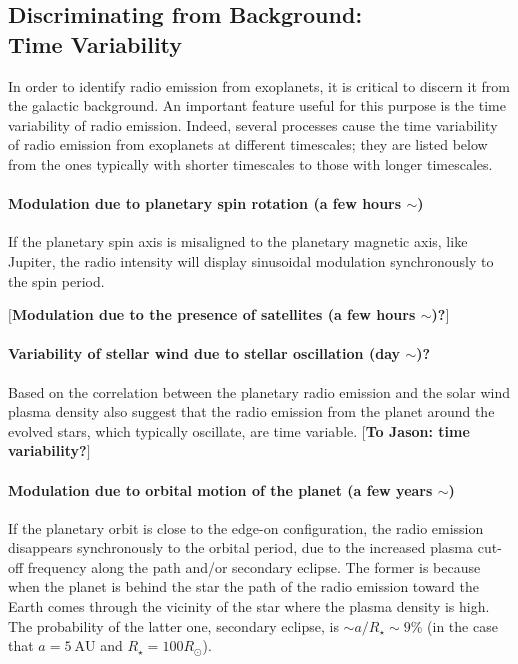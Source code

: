\documentclass{emulateapj}
\def\memoYF#1{\color{red}$[${\bf #1}$]$ \color{black}}
\begin{document}
\subsection{Discriminating from Background:\\Time Variability}
\label{ss:timevariability}


In order to identify radio emission from exoplanets, it is critical to discern it from the galactic background. 
An important feature useful for this purpose is the time variability of radio emission. 
Indeed, several processes cause the time variability of radio emission from exoplanets at different timescales; they are listed below from the ones typically with shorter timescales to those with longer timescales. 

\paragraph{Modulation due to planetary spin rotation (a few hours $\sim $)} 
If the planetary spin axis is misaligned to the planetary magnetic axis, like Jupiter, the radio intensity  will display sinusoidal modulation synchronously to the spin period. 
%

\memoYF{Modulation due to the presence of satellites (a few hours $\sim $)?} 
%

\paragraph{Variability of stellar wind due to stellar oscillation (day $\sim $)?}
Based on the correlation between the planetary radio emission and the solar wind plasma density also suggest that the radio emission from the planet around the evolved stars, which typically oscillate, are time variable. \memoYF{To Jason: time variability?}
%
\paragraph{Modulation due to orbital motion of the planet (a few years $\sim $)}
If the planetary orbit is close to the edge-on configuration, the radio emission disappears synchronously to the orbital period, due to the increased plasma cut-off frequency along the path and/or secondary eclipse. The former is because when the planet is behind the star the path of the radio emission toward the Earth comes through the vicinity of the star where the plasma density is high. The probability of the latter one, secondary eclipse, is $\sim a/R_\star \sim 9$\% (in the case that $a=5~\mathrm{AU}$ and $R_{\star}=100R_{\odot }$). 
%
\end{document}
